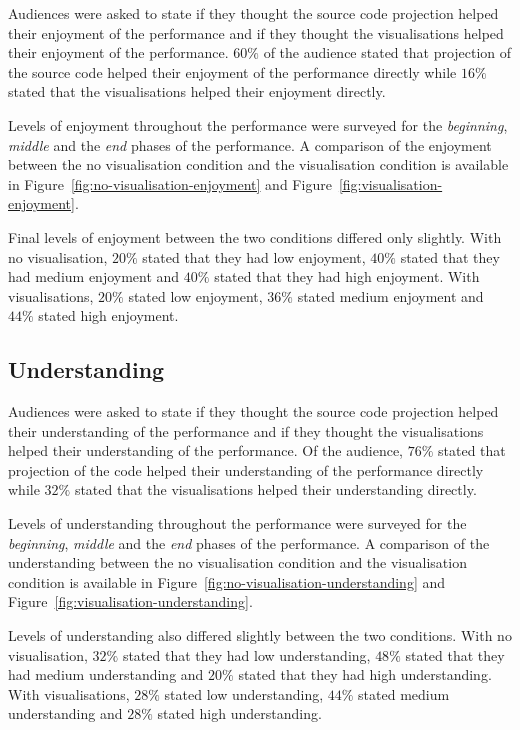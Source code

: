 

Audiences were asked to state if they thought the source code projection helped their enjoyment of the performance and if they thought the visualisations helped their enjoyment of the performance. $60\%$ of the audience stated that projection of the source code helped their enjoyment of the performance directly while $16\%$ stated that the visualisations helped their enjoyment directly.

Levels of enjoyment throughout the performance were surveyed for the \emph{beginning}, \emph{middle} and the \emph{end} phases of the performance. A comparison of the enjoyment between the no visualisation condition and the visualisation condition is available in Figure~\ref{fig:no-visualisation-enjoyment} and Figure~\ref{fig:visualisation-enjoyment}.

Final levels of enjoyment between the two conditions differed only slightly. With no visualisation, $20\%$ stated that they had low enjoyment, $40\%$ stated that they had medium enjoyment and $40\%$ stated that they had high enjoyment. With visualisations, $20\%$ stated low enjoyment, $36\%$ stated medium enjoyment and $44\%$ stated high enjoyment.

\subsection{Understanding}



Audiences were asked to state if they thought the source code projection helped their understanding of the performance and if they thought the visualisations helped their understanding of the performance. Of the audience, $76\%$ stated that projection of the code helped their understanding of the performance directly while $32\%$ stated that the visualisations helped their understanding directly.

Levels of understanding throughout the performance were surveyed for the \emph{beginning}, \emph{middle} and the \emph{end} phases of the performance. A comparison of the understanding between the no visualisation condition and the visualisation condition is available in Figure~\ref{fig:no-visualisation-understanding} and Figure~\ref{fig:visualisation-understanding}.

Levels of understanding also differed slightly between the two conditions. With no visualisation, $32\%$ stated that they had low understanding, $48\%$ stated that they had medium understanding and $20\%$ stated that they had high understanding. With visualisations, $28\%$ stated low understanding, $44\%$ stated medium understanding and $28\%$ stated high understanding.

